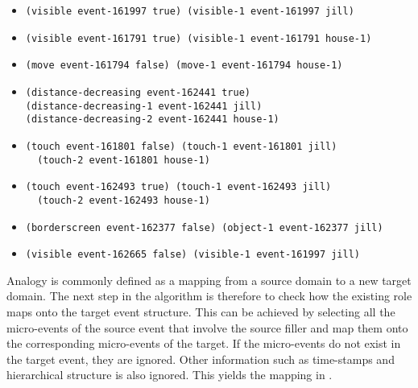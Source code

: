 \begin{itemize}
\item \begin{lstlisting}
(visible event-161997 true) (visible-1 event-161997 jill)
\end{lstlisting}

\item \begin{lstlisting}
(visible event-161791 true) (visible-1 event-161791 house-1)
\end{lstlisting}

\item 
\begin{lstlisting}
(move event-161794 false) (move-1 event-161794 house-1)
\end{lstlisting}


\item\begin{lstlisting}
(distance-decreasing event-162441 true)
(distance-decreasing-1 event-162441 jill)
(distance-decreasing-2 event-162441 house-1)
\end{lstlisting}

\item 
\begin{lstlisting}
(touch event-161801 false) (touch-1 event-161801 jill)
  (touch-2 event-161801 house-1)
\end{lstlisting}

\item \begin{lstlisting}
(touch event-162493 true) (touch-1 event-162493 jill)
  (touch-2 event-162493 house-1)
\end{lstlisting}

\item\begin{lstlisting}
(borderscreen event-162377 false) (object-1 event-162377 jill)
\end{lstlisting}

\item \begin{lstlisting}
(visible event-162665 false) (visible-1 event-161997 jill)
\end{lstlisting}
\end{itemize} 

Analogy is commonly defined as a mapping from a source domain to a new target domain. The next step in the algorithm is therefore to check how the existing role maps onto the target event structure. This can be achieved by selecting all the micro-events of the source event that involve the source filler and map them onto the corresponding micro-events of the target. If the micro-events do not exist in the target event, they are ignored. Other information such as time-stamps and hierarchical structure is also ignored. This yields the mapping in .

